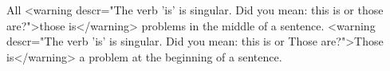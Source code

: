 
    All <warning descr="The verb 'is' is singular. Did you mean: this is or those are?">those is</warning> problems in the middle of a sentence.
    <warning descr="The verb 'is' is singular. Did you mean: this is or Those are?">Those is</warning> a problem at the beginning of a sentence.
